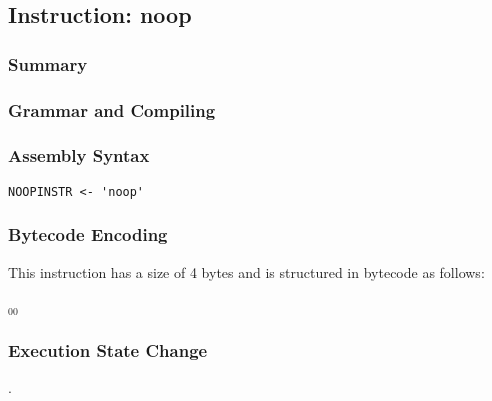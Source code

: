 \subsection{Instruction: noop}

\subsubsection{Summary}


\subsubsection{Grammar and Compiling}


\subsubsection{Assembly Syntax}

\begin{myquote}
\begin{verbatim}
NOOPINSTR <- 'noop'
\end{verbatim}
\end{myquote}


\subsubsection{Bytecode Encoding}

This instruction has a size of 4 bytes and is structured in bytecode as follows:

$_{00}$\ 


\subsubsection{Execution State Change}

.


